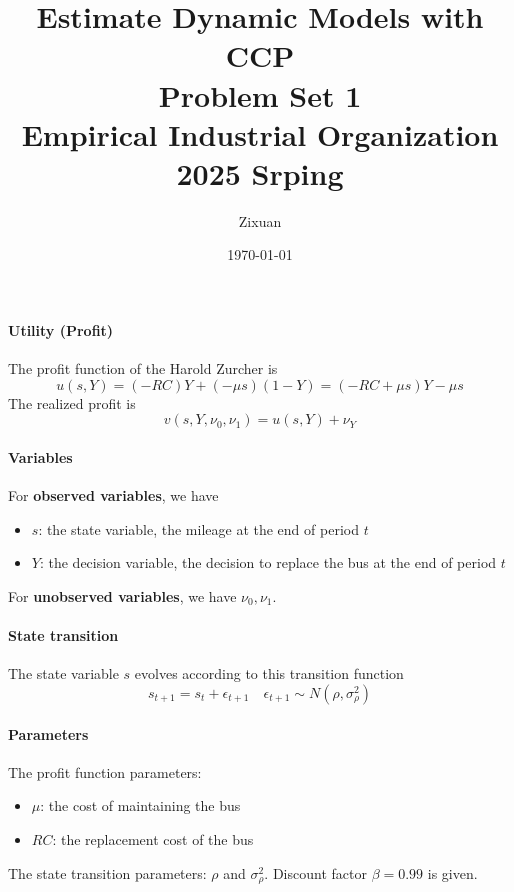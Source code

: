 \documentclass[12pt]{article}[margin=1in]
\title{\textbf{Estimate Dynamic Models with CCP} \\
    \vspace{.3cm}
    \large Problem Set 1 \\
    Empirical Industrial Organization 2025 Srping}
\author{Zixuan}
\date{\today}
\begin{document}
\maketitle

\setcounter{page}{1}

\paragraph{Utility (Profit)}
The profit function of the Harold Zurcher is
\begin{equation*}
    u(s,Y) = (-RC)Y + (-\mu s)(1 - Y) = (-RC + \mu s)Y - \mu s
\end{equation*}
The realized profit is
\begin{equation*}
    v(s,Y,\nu_0,\nu_1) = u(s,Y) + \nu_Y
\end{equation*}

\paragraph{Variables} For \textbf{observed variables}, we have
\begin{itemize}
    \item $s$: the state variable, the mileage at the end of period $t$
    \item $Y$: the decision variable, the decision to replace the bus at the end of period $t$
\end{itemize}
For \textbf{unobserved variables}, we have $\nu_0,\nu_1$.
\paragraph{State transition} The state variable $s$ evolves according to this transition function
\begin{equation*}
    s_{t+1} = s_t + \epsilon_{t+1} \quad \epsilon_{t+1} \sim N(\rho, \sigma_{\rho}^2)
\end{equation*}
\paragraph{Parameters} The profit function parameters:
\begin{itemize}
    \item $\mu$: the cost of maintaining the bus
    \item $RC$: the replacement cost of the bus
\end{itemize}
The state transition parameters: $\rho$ and $\sigma_{\rho}^2$.
Discount factor $\beta=0.99$ is given.
\end{document}
